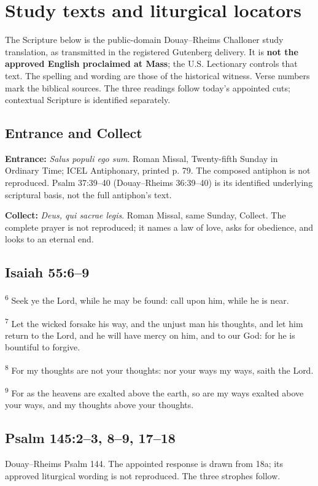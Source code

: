 \section{Study texts and liturgical locators}
The Scripture below is the public-domain Douay--Rheims Challoner study translation, as transmitted in the registered Gutenberg delivery. It is \textbf{not the approved English proclaimed at Mass}; the U.S. Lectionary controls that text. The spelling and wording are those of the historical witness. Verse numbers mark the biblical sources. The three readings follow today's appointed cuts; contextual Scripture is identified separately.

\subsection{Entrance and Collect}
\label{proper-entrance}
\textbf{Entrance:} \textit{Salus populi ego sum}. Roman Missal, Twenty-fifth Sunday in Ordinary Time; ICEL Antiphonary, printed p. 79. The composed antiphon is not reproduced. Psalm 37:39--40 (Douay--Rheims 36:39--40) is its identified underlying scriptural basis, not the full antiphon's text.

\label{proper-collect}
\textbf{Collect:} \textit{Deus, qui sacrae legis}. Roman Missal, same Sunday, Collect. The complete prayer is not reproduced; it names a law of love, asks for obedience, and looks to an eternal end.

\subsection{Isaiah 55:6--9}
\label{proper-first-reading}

\textsuperscript{6} Seek ye the Lord, while he may be found: call upon him, while he is near.

\textsuperscript{7} Let the wicked forsake his way, and the unjust man his thoughts, and let him return to the Lord, and he will have mercy on him, and to our God: for he is bountiful to forgive.

\textsuperscript{8} For my thoughts are not your thoughts: nor your ways my ways, saith the Lord.

\textsuperscript{9} For as the heavens are exalted above the earth, so are my ways exalted above your ways, and my thoughts above your thoughts.

\subsection{Psalm 145:2--3, 8--9, 17--18}
\label{proper-responsorial-psalm}
Douay--Rheims Psalm 144. The appointed response is drawn from 18a; its approved liturgical wording is not reproduced. The three strophes follow.

